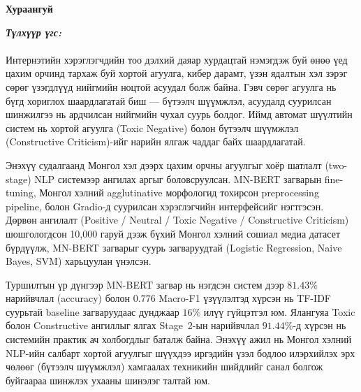 

\begin{center}
{\scshape\Large \univname\par} %
{\scshape\large \facname\par}\vspace{0.5cm} %
{\huge\textbf{{Хураангуй}} \par}
\bigskip
{\Large{\ttitle} \par} %
\bigskip

{\normalsize \shortname \par}\addressname


\end{center}

\textit{\textbf{Түлхүүр үгс: \keywordnames}}
\paragraph{}Интернэтийн хэрэглэгчдийн тоо дэлхий даяар хурдацтай нэмэгдэж буй өнөө үед цахим орчинд тархаж буй хортой агуулга, кибер дарамт, үзэн ядалтын хэл зэрэг сөрөг үзэгдлүүд нийгмийн ноцтой асуудал болж байна. Гэвч сөрөг агуулга нь бүгд хориглох шаардлагатай биш --- бүтээлч шүүмжлэл, асуудалд суурилсан шинжилгээ нь ардчилсан нийгмийн чухал суурь болдог. Иймд автомат шүүлтийн систем нь хортой агуулга (Toxic Negative) болон бүтээлч шүүмжлэл (Constructive Criticism)-ийг нарийн ялгаж чаддаг байх шаардлагатай.

Энэхүү судалгаанд Монгол хэл дээрх цахим орчны агуулгыг хоёр шатлалт (two-stage) NLP системээр ангилах аргыг боловсруулсан. MN-BERT загварын fine-tuning, Монгол хэлний agglutinative морфологид тохирсон preprocessing pipeline, болон Gradio-д суурилсан хэрэглэгчийн интерфейсийг нэгтгэсэн. Дөрвөн ангилалт (Positive / Neutral / Toxic Negative / Constructive Criticism) шошгологдсон 10,000 гаруй дээж бүхий Монгол хэлний сошиал медиа датасет бүрдүүлж, MN-BERT загварыг суурь загваруудтай (Logistic Regression, Naive Bayes, SVM) харьцуулан үнэлсэн.

Туршилтын үр дүнгээр MN-BERT загвар нь нэгдсэн систем дээр $81.43\%$ нарийвчлал (accuracy) болон $0.776$ Macro-F1 үзүүлэлтэд хүрсэн нь TF-IDF суурьтай baseline загваруудаас дунджаар $16\%$ илүү гүйцэтгэл юм. Ялангуяа Toxic болон Constructive ангиллыг ялгах Stage~2-ын нарийвчлал $91.44\%$-д хүрсэн нь системийн практик ач холбогдлыг баталж байна. Энэхүү ажил нь Монгол хэлний NLP-ийн салбарт хортой агуулгыг шүүхдээ иргэдийн үзэл бодлоо илэрхийлэх эрх чөлөөг (бүтээлч шүүмжлэл) хамгаалах техникийн шийдлийг санал болгож буйгаараа шинжлэх ухааны шинэлэг талтай юм.
